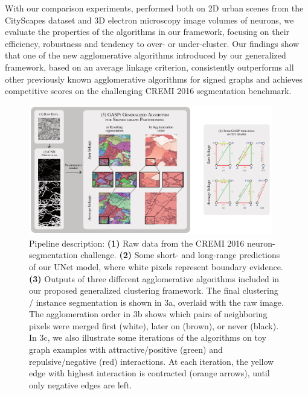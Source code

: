 With our comparison experiments, performed both on 2D urban scenes from the CityScapes dataset and 3D electron microscopy image volumes of neurons, we evaluate the properties of the algorithms in our framework, focusing on their efficiency, robustness and tendency to over- or under-cluster.
Our findings show that one of the new agglomerative algorithms introduced by our generalized framework, based on an average linkage criterion, consistently outperforms all other previously known agglomerative algorithms for signed graphs and achieves competitive scores on the challenging CREMI 2016 segmentation benchmark.



\begin{figure}[t]
\centering
\includegraphics[width=0.95\textwidth]{./figs/intro_image_v3.pdf} %
\caption{ Pipeline description: \textbf{(1)} Raw data from the CREMI 2016 neuron-segmentation challenge. \textbf{(2)} Some short- and long-range predictions of our UNet model, where white pixels represent boundary evidence. \textbf{(3)} Outputs of three different agglomerative algorithms included in our proposed generalized clustering framework. The final clustering / instance segmentation is shown in 3a, overlaid with the raw image.  The  agglomeration order in 3b shows which pairs of neighboring pixels were merged first (white), later on (brown), or never (black). In 3c, we also illustrate some iterations of the algorithms on toy graph examples with attractive/positive (green) and repulsive/negative (red) interactions. At each iteration, the yellow edge with highest interaction is contracted (orange arrows), until only negative edges are left.
\label{fig:intro_figure}}
\end{figure}
